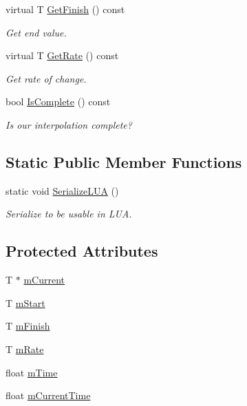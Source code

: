 \begin{DoxyCompactItemize}
virtual T \hyperlink{classInterpolation_add0c83c3628185c9ee0f5079f2138eba}{Get\+Finish} () const 
\begin{DoxyCompactList}\small\item\em Get end value. \end{DoxyCompactList}\item 
virtual T \hyperlink{classInterpolation_a07e29a4079bcb45207e1bb33684228ae}{Get\+Rate} () const 
\begin{DoxyCompactList}\small\item\em Get rate of change. \end{DoxyCompactList}\item 
bool \hyperlink{classInterpolation_a54d7e7163300b1a9302d35d20c3feee1}{Is\+Complete} () const 
\begin{DoxyCompactList}\small\item\em Is our interpolation complete? \end{DoxyCompactList}\end{DoxyCompactItemize}
\subsection*{Static Public Member Functions}
\begin{DoxyCompactItemize}
\item 
static void \hyperlink{classInterpolation_a644ac6b64645e6389519132f048d0a73}{Serialize\+L\+UA} ()
\begin{DoxyCompactList}\small\item\em Serialize to be usable in L\+UA. \end{DoxyCompactList}\end{DoxyCompactItemize}
\subsection*{Protected Attributes}
\begin{DoxyCompactItemize}
\item 
T $\ast$ \hyperlink{classInterpolation_a02987437e1cc17297e06ac1911a6a774}{m\+Current}
\item 
T \hyperlink{classInterpolation_a9bba635b064dd3e0611b0facc4a01170}{m\+Start}
\item 
T \hyperlink{classInterpolation_a96f311853963b74a2337287590ceb909}{m\+Finish}
\item 
T \hyperlink{classInterpolation_a24a6681cfb8052d9c4db1c75b3849918}{m\+Rate}
\item 
float \hyperlink{classInterpolation_a3ea4f26ef55bebf383e816fe60b5e967}{m\+Time}
\item 
float \hyperlink{classInterpolation_add1dd727ba837d544442bfd7b240bd3b}{m\+Current\+Time}
\end{DoxyCompactItemize}


